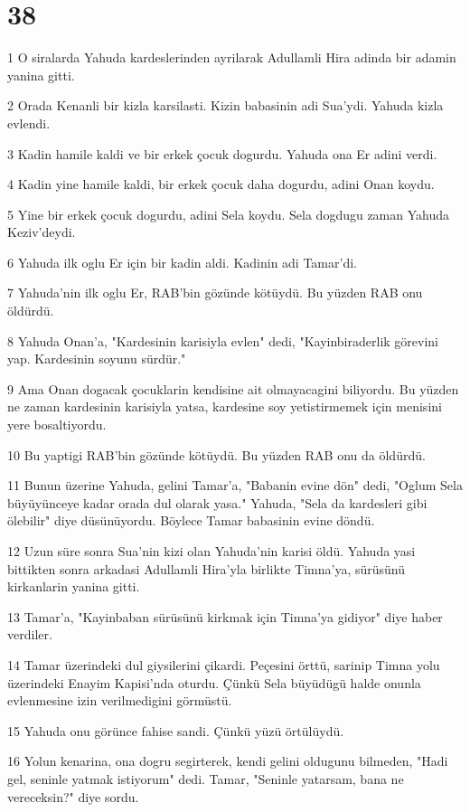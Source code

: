 \chapter{38}

\par 1 O siralarda Yahuda kardeslerinden ayrilarak Adullamli Hira adinda bir adamin yanina gitti.
\par 2 Orada Kenanli bir kizla karsilasti. Kizin babasinin adi Sua'ydi. Yahuda kizla evlendi.
\par 3 Kadin hamile kaldi ve bir erkek çocuk dogurdu. Yahuda ona Er adini verdi.
\par 4 Kadin yine hamile kaldi, bir erkek çocuk daha dogurdu, adini Onan koydu.
\par 5 Yine bir erkek çocuk dogurdu, adini Sela koydu. Sela dogdugu zaman Yahuda Keziv'deydi.
\par 6 Yahuda ilk oglu Er için bir kadin aldi. Kadinin adi Tamar'di.
\par 7 Yahuda'nin ilk oglu Er, RAB'bin gözünde kötüydü. Bu yüzden RAB onu öldürdü.
\par 8 Yahuda Onan'a, "Kardesinin karisiyla evlen" dedi, "Kayinbiraderlik görevini yap. Kardesinin soyunu sürdür."
\par 9 Ama Onan dogacak çocuklarin kendisine ait olmayacagini biliyordu. Bu yüzden ne zaman kardesinin karisiyla yatsa, kardesine soy yetistirmemek için menisini yere bosaltiyordu.
\par 10 Bu yaptigi RAB'bin gözünde kötüydü. Bu yüzden RAB onu da öldürdü.
\par 11 Bunun üzerine Yahuda, gelini Tamar'a, "Babanin evine dön" dedi, "Oglum Sela büyüyünceye kadar orada dul olarak yasa." Yahuda, "Sela da kardesleri gibi ölebilir" diye düsünüyordu. Böylece Tamar babasinin evine döndü.
\par 12 Uzun süre sonra Sua'nin kizi olan Yahuda'nin karisi öldü. Yahuda yasi bittikten sonra arkadasi Adullamli Hira'yla birlikte Timna'ya, sürüsünü kirkanlarin yanina gitti.
\par 13 Tamar'a, "Kayinbaban sürüsünü kirkmak için Timna'ya gidiyor" diye haber verdiler.
\par 14 Tamar üzerindeki dul giysilerini çikardi. Peçesini örttü, sarinip Timna yolu üzerindeki Enayim Kapisi'nda oturdu. Çünkü Sela büyüdügü halde onunla evlenmesine izin verilmedigini görmüstü.
\par 15 Yahuda onu görünce fahise sandi. Çünkü yüzü örtülüydü.
\par 16 Yolun kenarina, ona dogru segirterek, kendi gelini oldugunu bilmeden, "Hadi gel, seninle yatmak istiyorum" dedi. Tamar, "Seninle yatarsam, bana ne vereceksin?" diye sordu.
